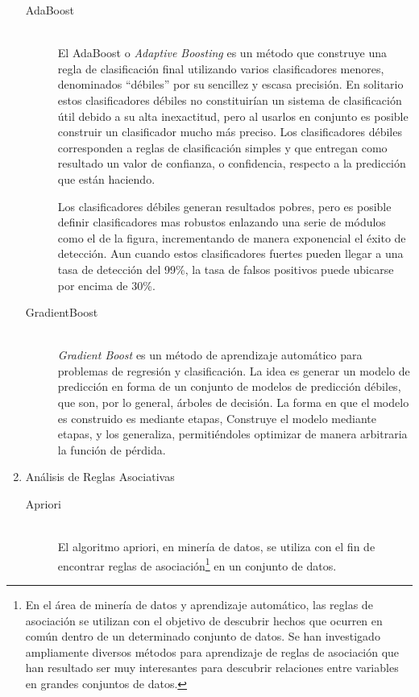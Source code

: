 \begin{enumerate}
\begin{description}
      \item[AdaBoost] \hfill \\
      El AdaBoost\cite{collins2002logistic} o \textit{Adaptive Boosting} es un método que construye una regla de clasificación final utilizando varios clasificadores menores, denominados “débiles” por su sencillez y escasa precisión. En solitario estos clasificadores débiles no constituirían un sistema de clasificación útil debido a su alta inexactitud, pero al usarlos en conjunto es posible construir un clasificador mucho más preciso. Los clasificadores débiles corresponden a reglas de clasificación simples y que entregan como resultado un valor de confianza, o confidencia, respecto a la predicción que están haciendo.
      
      Los clasificadores débiles  generan resultados pobres, pero es posible  definir clasificadores mas robustos enlazando una serie de módulos como el de la figura,  incrementando de manera exponencial el éxito de detección. Aun cuando estos clasificadores fuertes  pueden llegar a una tasa de detección del 99\%, la tasa de falsos positivos puede ubicarse por encima de 30\%.
      
      \item[GradientBoost] \hfill \\
      \textit{Gradient Boost}\cite{schapire2003boosting} es un método de aprendizaje automático para problemas de regresión y clasificación. La idea es generar un modelo de predicción en forma de un conjunto de modelos de predicción débiles, que son, por lo general, árboles de decisión. La forma en que el modelo es construido es mediante etapas, Construye el modelo mediante etapas, y los generaliza, permitiéndoles optimizar de manera arbitraria la función de pérdida.
      
    \end{description}
    
    
  \item Análisis de Reglas Asociativas
    \begin{description}
    
      \item[Apriori] \hfill \\
      El algoritmo apriori\cite{agrawal1994fast}, en minería de datos, se utiliza con el fin de encontrar reglas de asociación\footnote{En el área de minería de datos y aprendizaje automático, las reglas de asociación se utilizan con el objetivo de descubrir hechos que ocurren en común dentro de un determinado conjunto de datos. Se han investigado ampliamente diversos métodos para aprendizaje de reglas de asociación que han resultado ser muy interesantes para descubrir relaciones entre variables en grandes conjuntos de datos.} en un conjunto de datos. 
      

\end{description}
\end{enumerate}
